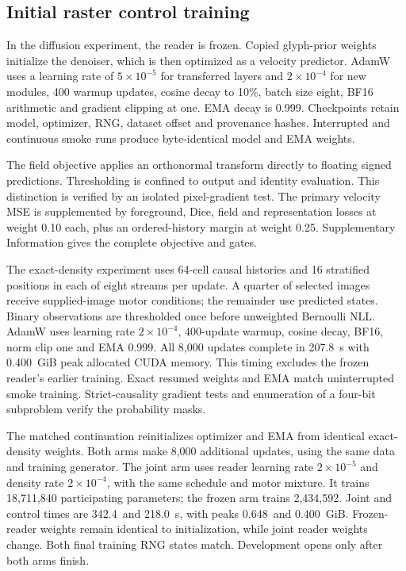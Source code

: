 \documentclass[12pt,a4paper]{article}
\newcommand{\DensitySeconds}{207.8}
\newcommand{\DensityMemory}{0.400}
\newcommand{\JointTime}{342.4}
\newcommand{\ControlTime}{218.0}
\newcommand{\JointMemory}{0.648}
\newcommand{\ControlMemory}{0.400}
\begin{document}
\subsection*{Initial raster control training}
In the diffusion experiment, the reader is frozen. Copied glyph-prior weights initialize the denoiser,
which is then optimized as a velocity predictor. AdamW uses a learning rate of
$5\times10^{-5}$ for transferred layers and $2\times10^{-4}$ for new modules,
400 warmup updates, cosine decay to 10\%, batch size eight, BF16 arithmetic and
gradient clipping at one. EMA decay is 0.999. Checkpoints retain model,
optimizer, RNG, dataset offset and provenance hashes. Interrupted and
continuous smoke runs produce byte-identical model and EMA weights.

The field objective applies an orthonormal transform directly to floating
signed predictions. Thresholding is confined to output and identity
evaluation. This distinction is verified by an isolated pixel-gradient test.
The primary velocity MSE is supplemented by foreground, Dice, field and
representation losses at weight 0.10 each, plus an ordered-history margin at
weight 0.25. Supplementary Information gives the complete objective and gates.

The exact-density experiment uses 64-cell causal histories and 16 stratified
positions in each of eight streams per update. A quarter of selected images
receive supplied-image motor conditions; the remainder use predicted states.
Binary observations are thresholded once before unweighted Bernoulli NLL.
AdamW uses learning rate $2\times10^{-4}$, 400-update warmup, cosine decay,
BF16, norm clip one and EMA 0.999. All 8,000 updates complete in
\DensitySeconds\ s with \DensityMemory\ GiB peak allocated CUDA memory.
This timing excludes the frozen reader's earlier training. Exact resumed
weights and EMA match uninterrupted smoke training. Strict-causality gradient
tests and enumeration of a four-bit subproblem verify the probability masks.

The matched continuation reinitializes optimizer and EMA from identical
exact-density weights. Both arms make 8,000 additional updates, using the same
data and training generator. The joint arm uses reader learning rate
$2\times10^{-5}$ and density rate $2\times10^{-4}$, with the same schedule and
motor mixture. It trains 18,711,840 participating parameters; the frozen arm
trains 2,434,592. Joint and control times are \JointTime\ and \ControlTime\ s,
with peaks \JointMemory\ and \ControlMemory\ GiB. Frozen-reader weights remain
identical to initialization, while joint reader weights change. Both final
training RNG states match. Development opens only after both arms finish.
\end{document}
